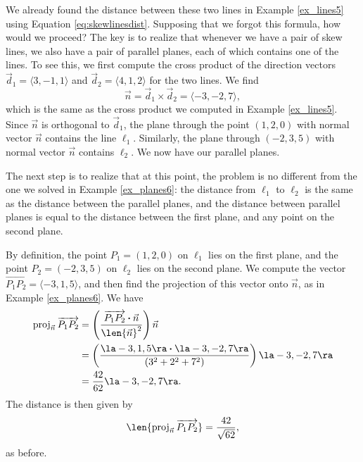 {We already found the distance between these two lines in Example \ref{ex_lines5} using Equation \eqref{eq:skewlinesdist}. Supposing that we forgot this formula, how would we proceed? The key is to realize that whenever we have a pair of skew lines, we also have a pair of parallel planes, each of which contains one of the lines. To see this, we first compute the cross product of the direction vectors $\vec{d}_1 = \langle 3, -1, 1\rangle$ and $\vec{d}_2 = \langle 4, 1, 2\rangle$ for the two lines. We find
\[
\vec{n} = \vec{d}_1\times\vec{d}_2 =  \langle -3, -2, 7\rangle,
\]
which is the same as the cross product we computed in Example \ref{ex_lines5}. Since $\vec{n}$ is orthogonal to $\vec{d}_1$, the plane through the point $(1,2,0)$ with normal vector $\vec{n}$ contains the line $\ell_1$. Similarly, the plane through $(-2,3,5)$ with normal vector $\vec{n}$ contains $\ell_2$. We now have our parallel planes.

The next step is to realize that at this point, the problem is no different from the one we solved in Example \ref{ex_planes6}: the distance from $\ell_1$ to $\ell_2$ is the same as the distance between the parallel planes, and the distance between parallel planes is equal to the distance between the first plane, and any point on the second plane.

By definition, the point $P_1 = (1,2,0)$ on $\ell_1$ lies on the first plane, and the point $P_2 = (-2, 3, 5)$ on $\ell_2$ lies on the second plane. We compute the vector $\overrightarrow{P_1P_2} = \langle -3, 1, 5\rangle$, and then find the projection of this vector onto $\vec{n}$, as in Example \ref{ex_planes6}. We have
\begin{align*}
\operatorname{proj}_{\vec n}\overrightarrow{P_1P_2} & = \left(\frac{\overrightarrow{P_1P_2}\boldsymbol{\cdot}\vec n}{\len{\vec n}^2}\right)\vec n\\
 & = \left(\frac{\la -3, 1, 5\ra \boldsymbol{\cdot} \la -3, -2, 7\ra}{(3^2+2^2+7^2)}\right)\la -3, -2, 7\ra\\
 & = \frac{42}{62}\la -3, -2, 7\ra.
\end{align*}
The distance is then given by
\[
\len{\operatorname{proj}_{\vec n}\overrightarrow{P_1P_2}} = \frac{42}{\sqrt{62}},
\]
as before.
}\\

